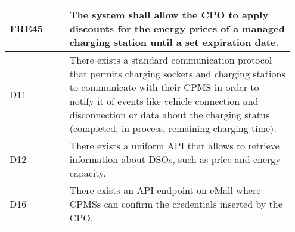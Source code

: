 {\begin{longtable}{|p{0.20\linewidth}p{0.75\linewidth} |}
    \hline
    \rowcolor{bluepoli!15} FRE45 &  The system shall allow the CPO to apply discounts for the energy prices of a managed charging station until a set expiration date.\\
    \hline
    \rowcolor{bluepoli!5} D11 & There exists a standard communication protocol that permits charging sockets and charging stations to communicate with their CPMS in order to notify it of events like vehicle connection and disconnection or data about the charging status (completed, in process, remaining charging time).\\
    \hline    
    \rowcolor{bluepoli!5} D12 & There exists a uniform API that allows to retrieve information about DSOs, such as price and energy capacity. \\
    \hline
    \rowcolor{bluepoli!5} D16 & There exists an API endpoint on eMall where CPMSs can confirm the credentials inserted by the CPO.\\
    \hline
\end{longtable}}
